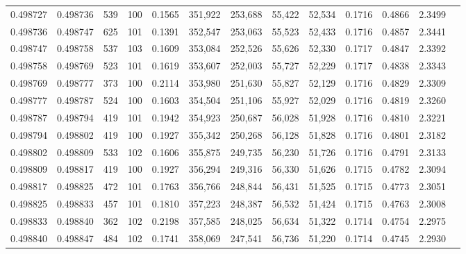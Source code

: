 \begin{tabular}{rrrrrrrrrrrrr}
0.498727 & 0.498736 &   539 & 100 &                                     0.1565 & 351,922 & 253,688 &  55,422 &  52,534 & 0.1716 & 0.4866 & 2.3499 \\
0.498736 & 0.498747 &   625 & 101 &                                     0.1391 & 352,547 & 253,063 &  55,523 &  52,433 & 0.1716 & 0.4857 & 2.3441 \\
0.498747 & 0.498758 &   537 & 103 &                                     0.1609 & 353,084 & 252,526 &  55,626 &  52,330 & 0.1717 & 0.4847 & 2.3392 \\
0.498758 & 0.498769 &   523 & 101 &                                     0.1619 & 353,607 & 252,003 &  55,727 &  52,229 & 0.1717 & 0.4838 & 2.3343 \\
0.498769 & 0.498777 &   373 & 100 &                                     0.2114 & 353,980 & 251,630 &  55,827 &  52,129 & 0.1716 & 0.4829 & 2.3309 \\
0.498777 & 0.498787 &   524 & 100 &                                     0.1603 & 354,504 & 251,106 &  55,927 &  52,029 & 0.1716 & 0.4819 & 2.3260 \\
0.498787 & 0.498794 &   419 & 101 &                                     0.1942 & 354,923 & 250,687 &  56,028 &  51,928 & 0.1716 & 0.4810 & 2.3221 \\
0.498794 & 0.498802 &   419 & 100 &                                     0.1927 & 355,342 & 250,268 &  56,128 &  51,828 & 0.1716 & 0.4801 & 2.3182 \\
0.498802 & 0.498809 &   533 & 102 &                                     0.1606 & 355,875 & 249,735 &  56,230 &  51,726 & 0.1716 & 0.4791 & 2.3133 \\
0.498809 & 0.498817 &   419 & 100 &                                     0.1927 & 356,294 & 249,316 &  56,330 &  51,626 & 0.1715 & 0.4782 & 2.3094 \\
0.498817 & 0.498825 &   472 & 101 &                                     0.1763 & 356,766 & 248,844 &  56,431 &  51,525 & 0.1715 & 0.4773 & 2.3051 \\
0.498825 & 0.498833 &   457 & 101 &                                     0.1810 & 357,223 & 248,387 &  56,532 &  51,424 & 0.1715 & 0.4763 & 2.3008 \\
0.498833 & 0.498840 &   362 & 102 &                                     0.2198 & 357,585 & 248,025 &  56,634 &  51,322 & 0.1714 & 0.4754 & 2.2975 \\
0.498840 & 0.498847 &   484 & 102 &                                     0.1741 & 358,069 & 247,541 &  56,736 &  51,220 & 0.1714 & 0.4745 & 2.2930 \\

\end{tabular}
